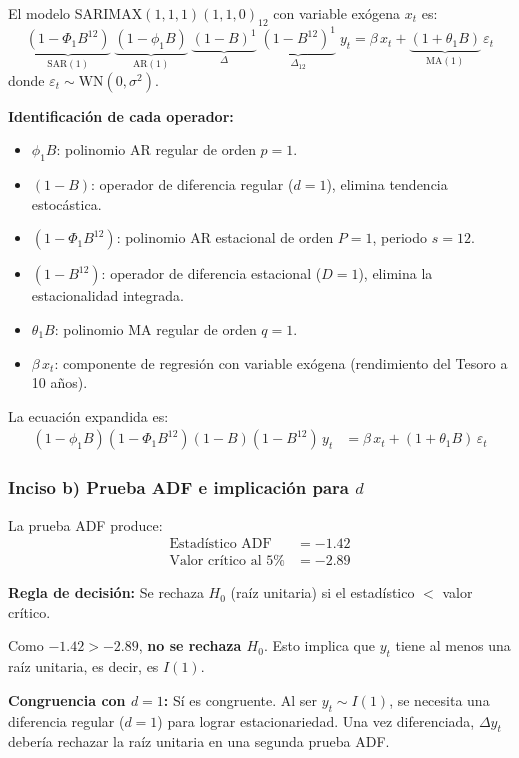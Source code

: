 \documentclass[12pt,a4paper]{article}
\begin{document}
\begin{solucion}
El modelo SARIMAX$(1,1,1)(1,1,0)_{12}$ con variable exógena $x_t$ es:
\begin{equation}
\underbrace{(1-\Phi_1 B^{12})}_{\text{SAR}(1)}\;
\underbrace{(1-\phi_1 B)}_{\text{AR}(1)}\;
\underbrace{(1-B)^1}_{\Delta}\;
\underbrace{(1-B^{12})^1}_{\Delta_{12}}\;
y_t
= \beta\,x_t + \underbrace{(1+\theta_1 B)}_{\text{MA}(1)}\,\varepsilon_t
\end{equation}
donde $\varepsilon_t\sim\mathrm{WN}(0,\sigma^2)$.

\medskip
\textbf{Identificación de cada operador:}
\begin{itemize}[noitemsep]
  \item $\phi_1 B$: polinomio AR regular de orden $p=1$.
  \item $(1-B)$: operador de diferencia regular ($d=1$), elimina tendencia estocástica.
  \item $(1-\Phi_1 B^{12})$: polinomio AR estacional de orden $P=1$, periodo $s=12$.
  \item $(1-B^{12})$: operador de diferencia estacional ($D=1$), elimina la estacionalidad integrada.
  \item $\theta_1 B$: polinomio MA regular de orden $q=1$.
  \item $\beta\,x_t$: componente de regresión con variable exógena (rendimiento del Tesoro a 10 años).
\end{itemize}

La ecuación expandida es:
\begin{align*}
(1-\phi_1 B)(1-\Phi_1 B^{12})(1-B)(1-B^{12})\,y_t &= \beta\,x_t + (1+\theta_1 B)\,\varepsilon_t
\end{align*}
\end{solucion}

\subsubsection*{Inciso b) Prueba ADF e implicación para $d$}

\begin{solucion}
La prueba ADF produce:
\begin{align*}
\text{Estadístico ADF} &= -1.42\\
\text{Valor crítico al 5\%} &= -2.89
\end{align*}

\textbf{Regla de decisión:} Se rechaza $H_0$ (raíz unitaria) si el estadístico $<$ valor crítico.

Como $-1.42 > -2.89$, \textbf{no se rechaza $H_0$}. Esto implica que $y_t$ tiene al menos una raíz unitaria, es decir, es $I(1)$.

\textbf{Congruencia con $d=1$:} Sí es congruente. Al ser $y_t\sim I(1)$, se necesita una diferencia regular ($d=1$) para lograr estacionariedad. Una vez diferenciada, $\Delta y_t$ debería rechazar la raíz unitaria en una segunda prueba ADF.
\end{solucion}
\end{document}
